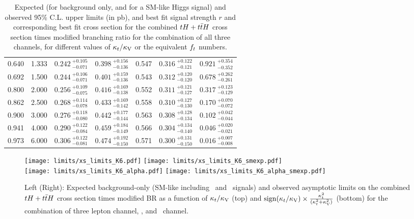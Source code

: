 \begin{table}[h!]
\begin{tabular}{rr|ccc|cc}
         0.640 &  1.333 & $0.242~_{-0.071}^{+0.105}$ & $0.398~_{-0.136}^{+0.156}$ & 0.547 & $0.316~_{-0.121}^{+0.122}$ & $0.921~_{-0.352}^{+0.354}$ \\
         0.692 &  1.500 & $0.244~_{-0.071}^{+0.106}$ & $0.401~_{-0.136}^{+0.159}$ & 0.543 & $0.312~_{-0.120}^{+0.120}$ & $0.678~_{-0.261}^{+0.262}$ \\
         0.800 &  2.000 & $0.256~_{-0.075}^{+0.109}$ & $0.416~_{-0.138}^{+0.169}$ & 0.552 & $0.311~_{-0.127}^{+0.121}$ & $0.317~_{-0.129}^{+0.123}$ \\
         0.862 &  2.500 & $0.268~_{-0.078}^{+0.114}$ & $0.433~_{-0.142}^{+0.169}$ & 0.558 & $0.310~_{-0.130}^{+0.127}$ & $0.170~_{-0.072}^{+0.070}$ \\
         0.900 &  3.000 & $0.276~_{-0.080}^{+0.118}$ & $0.442~_{-0.144}^{+0.177}$ & 0.563 & $0.308~_{-0.134}^{+0.128}$ & $0.102~_{-0.044}^{+0.042}$ \\
         0.941 &  4.000 & $0.290~_{-0.084}^{+0.122}$ & $0.459~_{-0.149}^{+0.184}$ & 0.566 & $0.304~_{-0.140}^{+0.134}$ & $0.046~_{-0.021}^{+0.020}$ \\
         0.973 &  6.000 & $0.306~_{-0.081}^{+0.122}$ & $0.474~_{-0.150}^{+0.192}$ & 0.571 & $0.300~_{-0.150}^{+0.131}$ & $0.016~_{-0.008}^{+0.007}$ \\
    \hline
  \end{tabular}
  \caption[Expected and observed upper limits.]{Expected (for background only, and for a SM-like Higgs signal) and observed 95\% C.L. upper limits (in pb), and best fit signal strength $r$ and corresponding best fit cross section for the combined $\tH+\ttH$ cross section times modified branching ratio for the combination of all three channels, for different values of $\kappa_t/\kappa_\text{V}$ or the equivalent $f_t$ numbers.}
  \label{tab:xslimits}
\end{table}

\begin{figure} [!h]
 \centering
 \texttt{[image: limits/xs\_limits\_K6.pdf]}
 \texttt{[image: limits/xs\_limits\_K6\_smexp.pdf]} \\  
 \texttt{[image: limits/xs\_limits\_K6\_alpha.pdf]}
 \texttt{[image: limits/xs\_limits\_K6\_alpha\_smexp.pdf]} 
\caption[Asymptotic limits on the combined $\tH+\ttH$ cross section times modified BR]{Left (Right): Expected background-only (SM-like including  \ttH\ and \tH\ signals) and observed asymptotic limits on the combined $\tH+\ttH$ cross section times modified BR as a function of $\kappa_t/\kappa_\text{V}$ (top) and $\mathrm{sign}(\kappa_t/\kappa_\text{V})\times\frac{\kappa_t^2}{(\kappa_t^2+\kappa_\text{V}^2)}$ (bottom) for the combination of three lepton channel, \mumu, and \emu\ channel. }
\label{fig:xs_limits}
\end{figure}

